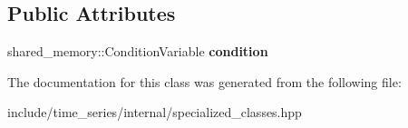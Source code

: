 \subsection*{Public Attributes}
\begin{DoxyCompactItemize}
\item 
shared\+\_\+memory\+::\+Condition\+Variable {\bfseries condition}\hypertarget{classtime__series_1_1internal_1_1ConditionVariable_3_01MultiProcesses_01_4_a06e19d063f59918dd503743aa3dc0d32}{}\label{classtime__series_1_1internal_1_1ConditionVariable_3_01MultiProcesses_01_4_a06e19d063f59918dd503743aa3dc0d32}

\end{DoxyCompactItemize}


The documentation for this class was generated from the following file\+:\begin{DoxyCompactItemize}
\item 
include/time\+\_\+series/internal/specialized\+\_\+classes.\+hpp\end{DoxyCompactItemize}
